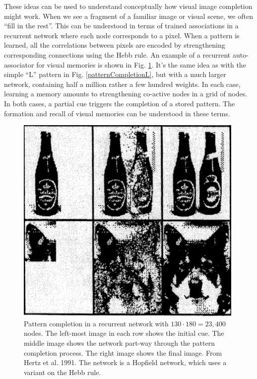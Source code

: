 These ideas can be used to understand conceptually how visual image completion might work. When we see a fragment of a familiar image or visual scene, we often ``fill in the rest''. This can be understood in terms of trained associations in a recurrent network where each node corresponds to a pixel. When a pattern is learned, all the correlations between pixels are encoded by strengthening corresponding connections using the Hebb rule. An example of a recurrent auto-associator for visual memories is shown in Fig. \ref{patternCompletionBeerDog}. It's the same idea as with the simple ``L'' pattern in Fig. \ref{patternCompletionL}, but with a much larger network, containing half a million rather a few hundred weights. In each case, learning a memory amounts to strengthening co-active nodes in a grid of nodes. In both cases, a partial cue triggers the completion of a stored pattern. The formation and recall of visual memories can be understood in these terms.  

\begin{figure}[h]
\centering
\includegraphics[scale=.8]{./images/patternCompletionBeerDog.png}
\caption[From Hertz, Krogh, and Palmer, 1991 \cite{hertz1991introduction}.]{Pattern completion in a recurrent network with $130 \cdot 180 = 23,400$ nodes. The left-most image in each row shows the initial cue. The middle image shows the network part-way through the pattern completion process. The right image shows the final image. From Hertz et al. 1991. The network is a Hopfield network, which uses a variant on the Hebb rule.}
\label{patternCompletionBeerDog}
\end{figure}


